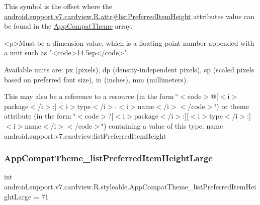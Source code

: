This symbol is the offset where the \hyperlink{classandroid_1_1support_1_1v7_1_1cardview_1_1R_1_1attr_a676d09478b28e34ac27954c7b6164b44}{android.\+support.\+v7.\+cardview.\+R.\+attr\#list\+Preferred\+Item\+Height} attribute\textquotesingle{}s value can be found in the \hyperlink{classandroid_1_1support_1_1v7_1_1cardview_1_1R_1_1styleable_a52e6f69f954ecc2622d72c0b4d298938}{App\+Compat\+Theme} array.

\begin{DoxyVerb}      <p>Must be a dimension value, which is a floating point number appended with a unit such as "<code>14.5sp</code>".
\end{DoxyVerb}
 Available units are\+: px (pixels), dp (density-\/independent pixels), sp (scaled pixels based on preferred font size), in (inches), mm (millimeters). 

This may also be a reference to a resource (in the form \char`\"{}$<$code$>$@\mbox{[}$<$i$>$package$<$/i$>$\+:\mbox{]}$<$i$>$type$<$/i$>$\+:$<$i$>$name$<$/i$>$$<$/code$>$\char`\"{}) or theme attribute (in the form \char`\"{}$<$code$>$?\mbox{[}$<$i$>$package$<$/i$>$\+:\mbox{]}\mbox{[}$<$i$>$type$<$/i$>$\+:\mbox{]}$<$i$>$name$<$/i$>$$<$/code$>$\char`\"{}) containing a value of this type.  name android.\+support.\+v7.\+cardview\+:list\+Preferred\+Item\+Height \mbox{\label{classandroid_1_1support_1_1v7_1_1cardview_1_1R_1_1styleable_a54f8f73307e3dad436997279e7e73d17}} 
\subsubsection{\texorpdfstring{App\+Compat\+Theme\+\_\+list\+Preferred\+Item\+Height\+Large}{AppCompatTheme\_listPreferredItemHeightLarge}}
{\footnotesize\ttfamily int android.\+support.\+v7.\+cardview.\+R.\+styleable.\+App\+Compat\+Theme\+\_\+list\+Preferred\+Item\+Height\+Large = 71\hspace{0.3cm}{\ttfamily [static]}}


